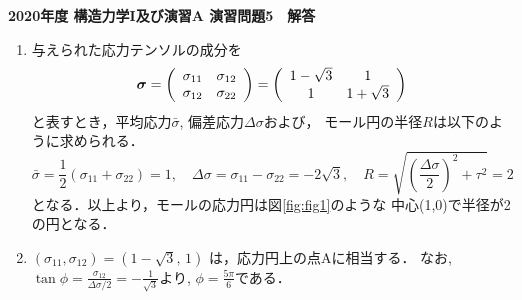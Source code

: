 \documentclass[10pt,a4j]{jarticle}
\newlength{\minitwocolumn}
\begin{document}
\newcommand{\fat}[1]{\mbox{\boldmath $#1$}}
\newcommand{\D}{\partial}
\newcommand{\w}{\omega}
\newcommand{\ga}{\alpha}
\newcommand{\gb}{\beta}
\newcommand{\gx}{\xi}
\newcommand{\gz}{\zeta}
\newcommand{\vhat}[1]{\hat{\fat{#1}}}
\newcommand{\spc}{\vspace{0.7\baselineskip}}
\newcommand{\halfspc}{\vspace{0.3\baselineskip}}

\pagestyle{empty}
\newcommand{\twofig}[2]
 {
   \begin{figure}[h]
     \begin{minipage}[t]{\minitwocolumn}
         \begin{center}   #1
         \end{center}
     \end{minipage}
         \hspace{\columnsep}
     \begin{minipage}[t]{\minitwocolumn}
         \begin{center} #2
         \end{center}
     \end{minipage}
   \end{figure}
 }
\begin{center}
{\Large \bf 2020年度 構造力学I及び演習A 演習問題5　解答} \\
\end{center}
\vspace{15mm}
\begin{enumerate}
\item
与えられた応力テンソルの成分を
\begin{equation}
	\fat{\sigma}
	=
	\left( 
		\begin{array}{cc}
		\sigma_{11} & \sigma_{12} \\
		\sigma_{12} & \sigma_{22} 
		\end{array}
	\right)
	=
	\left( 
		\begin{array}{cc}
			1-\sqrt{3} & 1\\
			1 & 1+\sqrt{3} 
		\end{array}
	\right)
	\label{eqn:sigma_given}
\end{equation}
と表すとき，平均応力$\bar{\sigma}$, 偏差応力$\Delta \sigma$および，
モール円の半径$R$は以下のように求められる．
\begin{equation}
	\bar{\sigma} 
	= \frac{1}{2}\left({ \sigma_{11} + \sigma_{22} }\right) = 1,
	\quad
	\Delta \sigma = \sigma_{11} - \sigma_{22} = -2\sqrt{3},
	\quad
	R = \sqrt{\left({ \frac{\Delta \sigma}{2} }\right)^2 + \tau^2 } 
	=2 
\end{equation}
となる．以上より，モールの応力円は図\ref{fig:fig1}のような
中心(1,0)で半径が2の円となる．
\item
	$\left(\sigma_{11}, \sigma_{12}\right)=\left(1-\sqrt{3}, \, 1 \right)$
は，応力円上の点Aに相当する．
		なお,$\tan \phi = \frac{\sigma_{12}}{\Delta \sigma/2}=-\frac{1}{\sqrt{3}}$より, 
$\phi=\frac{5\pi}{6}$である．
\end{enumerate}
\end{document}
